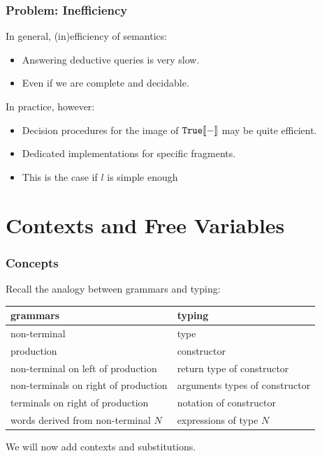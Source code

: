 \begin{frame}\frametitle{Problem: Inefficiency}
In general, (in)efficiency of semantics:
\begin{itemize}
\item Answering deductive queries is very slow.
\item Even if we are complete and decidable.
\end{itemize}

In practice, however:
\begin{itemize}
\item Decision procedures for the image of $\mathtt{True}\llbracket -\rrbracket$ may be quite efficient.
\item Dedicated implementations for specific fragments.
\item This is the case if $l$ is simple enough 
\end{itemize}
\end{frame}

\section{Contexts and Free Variables}

\begin{frame}\frametitle{Concepts}
Recall the analogy between grammars and typing:

\begin{center}
\begin{tabular}{l|l}
grammars & typing \\
\hline
non-terminal & type \\
production & constructor \\
non-terminal on left of production & return type of constructor \\
non-terminals on right of production & arguments types of constructor \\
terminals on right of production & notation of constructor\\
words derived from non-terminal $N$ & expressions of type $N$
\end{tabular}
\end{center}

We will now add contexts and substitutions.
\end{frame}

